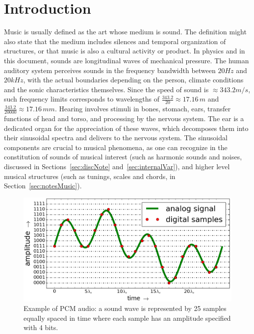 \section{Introduction}\label{sec:level1}
Music is usually defined as the art whose medium is sound.
The definition might also state that the medium includes silences
and temporal organization of structures, or that music
is also a cultural activity or product.
In physics and in this document, sounds are longitudinal waves of mechanical pressure.
The human auditory system perceives sounds in the frequency bandwidth between $20Hz$ and $20kHz$,
with the actual boundaries depending on the person,
climate conditions and the sonic characteristics themselves.
Since the speed of sound is $\approx 343.2 m/s$,
such frequency limits corresponds to  wavelengths of $\frac{343.2}{20} \approx 17.16\,m$ and
$\frac{343.2}{20000} \approx 17.16\,mm$.
Hearing involves stimuli in bones, stomach, ears,
transfer functions of head and torso,
and processing by the nervous system.
The ear is a dedicated organ for the appreciation of these waves,
which decomposes them into their sinusoidal spectra and delivers to the nervous system.
The sinusoidal components are crucial to musical phenomena,
as one can recognize in the constitution of sounds of musical interest
(such as harmonic sounds and noises, discussed in Sections~\ref{sec:discNote} and~\ref{sec:internalVar}),
and higher level musical structures (such as tunings, scales and chords, in Section~\ref{sec:notesMusic}).~\cite{Roederer}

\begin{figure}[!h]
    \centering
        \includegraphics[width=.7\textwidth]{figures/pcm_}
	\caption{Example of PCM audio:
	a sound wave is represented by 25 samples equally spaced in time where each sample has an amplitude specified with 4 bits.}
        \label{fig:PCM}
\end{figure}

